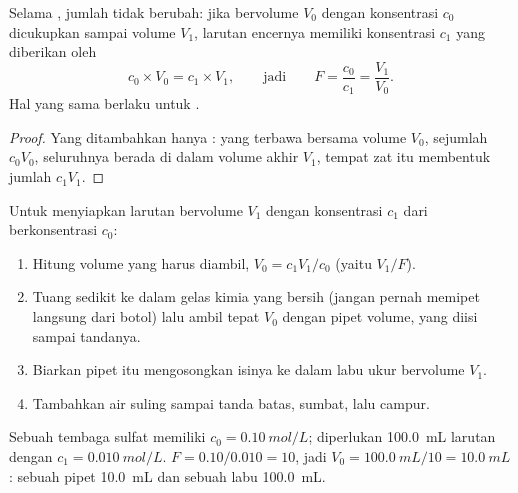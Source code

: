 \begin{proposition}\label{prop:g10:concentration-and-dilution:kept}
Selama , jumlah  tidak berubah: jika  bervolume $V_0$ dengan konsentrasi $c_0$ dicukupkan sampai volume
$V_1$, larutan encernya memiliki konsentrasi $c_1$ yang diberikan oleh
\[
  c_0 \times V_0 = c_1 \times V_1,
  \qquad\text{jadi}\qquad
  F = \frac{c_0}{c_1} = \frac{V_1}{V_0} .
\]
Hal yang sama berlaku untuk .
\end{proposition}

\begin{proof}
Yang ditambahkan hanya :  yang terbawa bersama volume
$V_0$, sejumlah $c_0 V_0$, seluruhnya berada di dalam volume akhir
$V_1$, tempat zat itu membentuk jumlah $c_1 V_1$.
\end{proof}


\begin{method}\label{met:g10:concentration-and-dilution:diluting}
Untuk menyiapkan larutan bervolume $V_1$ dengan konsentrasi $c_1$ dari
 berkonsentrasi $c_0$:
\begin{enumerate}
  \item Hitung volume  yang harus diambil,
        $V_0 = c_1 V_1 / c_0$ (yaitu $V_1 / F$).
  \item Tuang sedikit  ke dalam gelas kimia yang bersih
        (jangan pernah memipet langsung dari botol) lalu ambil tepat $V_0$
        dengan pipet volume, yang diisi sampai tandanya.
  \item Biarkan pipet itu mengosongkan isinya ke dalam labu ukur
        bervolume $V_1$.
  \item Tambahkan air suling sampai tanda batas, sumbat, lalu campur.
\end{enumerate}
\end{method}

\begin{example}\label{ex:g10:concentration-and-dilution:tenfold}
Sebuah  tembaga sulfat memiliki $c_0 = \qty{0.10}{mol/L}$;
diperlukan \qty{100.0}{mL} larutan dengan $c_1 = \qty{0.010}{mol/L}$.
 $F = 0.10 / 0.010 = 10$, jadi $V_0 = \qty{100.0}{mL} / 10 =
\qty{10.0}{mL}$: sebuah pipet \qty{10.0}{mL} dan sebuah labu
\qty{100.0}{mL}.
\end{example}

